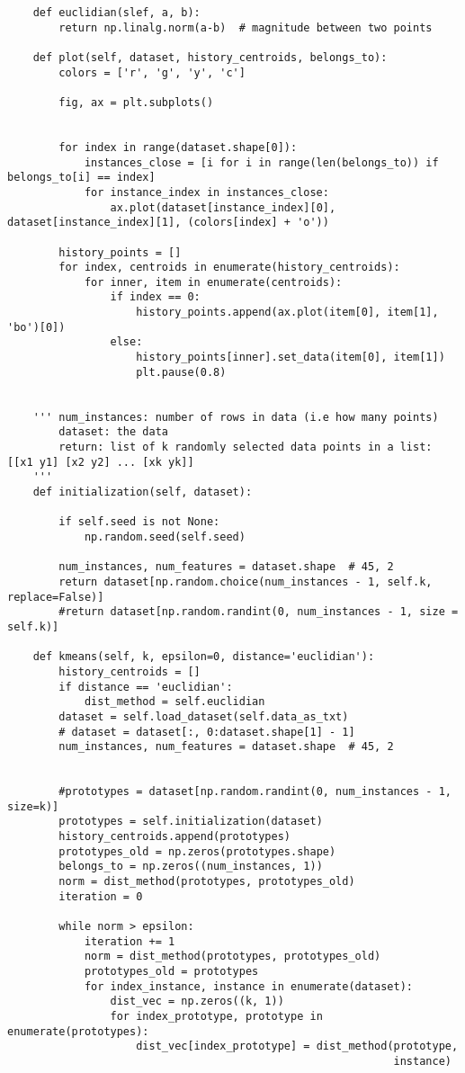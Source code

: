 \begin{verbatim}
    def euclidian(slef, a, b):
        return np.linalg.norm(a-b)  # magnitude between two points

    def plot(self, dataset, history_centroids, belongs_to):
        colors = ['r', 'g', 'y', 'c']

        fig, ax = plt.subplots()


        for index in range(dataset.shape[0]):
            instances_close = [i for i in range(len(belongs_to)) if belongs_to[i] == index]
            for instance_index in instances_close:
                ax.plot(dataset[instance_index][0], dataset[instance_index][1], (colors[index] + 'o'))

        history_points = []
        for index, centroids in enumerate(history_centroids):
            for inner, item in enumerate(centroids):
                if index == 0:
                    history_points.append(ax.plot(item[0], item[1], 'bo')[0])
                else:
                    history_points[inner].set_data(item[0], item[1])
                    plt.pause(0.8)


    ''' num_instances: number of rows in data (i.e how many points)
        dataset: the data
        return: list of k randomly selected data points in a list: [[x1 y1] [x2 y2] ... [xk yk]]
    '''
    def initialization(self, dataset):

        if self.seed is not None:
            np.random.seed(self.seed)

        num_instances, num_features = dataset.shape  # 45, 2
        return dataset[np.random.choice(num_instances - 1, self.k, replace=False)]
        #return dataset[np.random.randint(0, num_instances - 1, size = self.k)]

    def kmeans(self, k, epsilon=0, distance='euclidian'):
        history_centroids = []
        if distance == 'euclidian':
            dist_method = self.euclidian
        dataset = self.load_dataset(self.data_as_txt)
        # dataset = dataset[:, 0:dataset.shape[1] - 1]
        num_instances, num_features = dataset.shape  # 45, 2


        #prototypes = dataset[np.random.randint(0, num_instances - 1, size=k)]
        prototypes = self.initialization(dataset)
        history_centroids.append(prototypes)
        prototypes_old = np.zeros(prototypes.shape)
        belongs_to = np.zeros((num_instances, 1))
        norm = dist_method(prototypes, prototypes_old)
        iteration = 0

        while norm > epsilon:
            iteration += 1
            norm = dist_method(prototypes, prototypes_old)
            prototypes_old = prototypes
            for index_instance, instance in enumerate(dataset):
                dist_vec = np.zeros((k, 1))
                for index_prototype, prototype in enumerate(prototypes):
                    dist_vec[index_prototype] = dist_method(prototype,
                                                            instance)


\end{verbatim}

